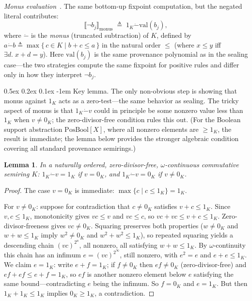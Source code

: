 \documentclass[acmsmall,review,anonymous]{acmart}
\makeatletter
\renewcommand{\paragraph}{\@startsection{paragraph}{4}{\z@}%
  {0.5ex \@plus 0.2ex \@minus 0.1ex}%
  {-1em}%
  {\normalfont\normalsize\bfseries}}
\newtheorem{lemma}{Lemma}
\theoremstyle{remark}
\numberwithin{definition}{section}
\numberwithin{theorem}{section}
\numberwithin{lemma}{section}
\numberwithin{corollary}{section}
\numberwithin{remark}{section}
\numberwithin{example}{section}
\numberwithin{observation}{section}
\numberwithin{assumption}{section}
\makeatother
\begin{document}
\emph{Monus evaluation}~\cite{dannert2021semiring}.
The same bottom-up fixpoint computation, but the negated literal
contributes:
\[
  \llbracket \neg b_j \rrbracket_{\mathrm{monus}}
  \;\triangleq\;
  1_K \mathbin{\dot{-}} \mathrm{val}(b_j),
\]
where $\mathbin{\dot{-}}$ is the \emph{monus} (truncated subtraction)
of $K$, defined by
$a \mathbin{\dot{-}} b \triangleq \max\{\,c \in K \mid b + c \le a\,\}$
in the natural order $\le$ (where $x \le y$ iff $\exists d.\; x + d = y$).
Here $\mathrm{val}(b_j)$ is the same provenance polynomial as in the
sealing case---the two strategies compute the same fixpoint for
positive rules and differ only in how they interpret $\neg b_j$.

\paragraph{Key lemma.}
The only non-obvious step is showing that monus against $1_K$ acts as
a zero-test---the same behavior as sealing.
The tricky aspect of monus is that $1_K \mathbin{\dot{-}} v$ could in
principle be some nonzero value less than $1_K$ when $v \neq 0_K$; the
zero-divisor-free condition rules this out.
(For the Boolean support abstraction $\mathrm{PosBool}[X]$, where all
nonzero elements are $\ge 1_K$, the result is immediate; the lemma
below provides the stronger algebraic condition covering all standard
provenance semirings.)

\begin{lemma}
  \label{lem:monus-negation-value}
  In a naturally ordered, zero-divisor-free, $\omega$-continuous
  commutative semiring $K$:
  $1_K \mathbin{\dot{-}} v = 1_K$ if $v = 0_K$, and
  $1_K \mathbin{\dot{-}} v = 0_K$ if $v \neq 0_K$.
\end{lemma}
\begin{proof}
  The case $v = 0_K$ is immediate:
  $\max\{c \mid c \le 1_K\} = 1_K$.

  For $v \neq 0_K$: suppose for contradiction that $c \neq 0_K$
  satisfies $v + c \le 1_K$.
  Since $v, c \le 1_K$, monotonicity gives $vc \le v$ and $vc \le c$,
  so $vc + vc \le v + c \le 1_K$.
  Zero-divisor-freeness gives $vc \neq 0_K$.
  Squaring preserves both properties ($w \neq 0_K$ and $w + w \le 1_K$
  imply $w^2 \neq 0_K$ and $w^2 + w^2 \le 1_K$), so repeated squaring
  yields a descending chain $(vc)^{2^n}$, all nonzero, all satisfying
  $w + w \le 1_K$.
  By $\omega$-continuity this chain has an infimum
  $e = (vc)^{2^\infty}$, still nonzero, with $e^2 = e$ and
  $e + e \le 1_K$.
  We claim $e = 1_K$: write $e + f = 1_K$; if $f \neq 0_K$ then
  $ef \neq 0_K$ (zero-divisor-free) and $ef + ef \le e + f = 1_K$,
  so $ef$ is another nonzero element below $e$ satisfying the same
  bound---contradicting $e$ being the infimum.
  So $f = 0_K$ and $e = 1_K$.
  But then $1_K + 1_K \le 1_K$ implies $0_K \ge 1_K$, a contradiction.
\end{proof}
\end{document}

